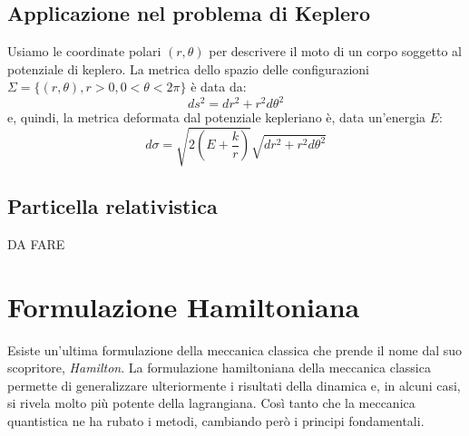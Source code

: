 \documentclass[a4paper,openany]{article}
\begin{document}
	\subsection{Applicazione nel problema di Keplero}
	Usiamo le coordinate polari $(r,\theta)$ per descrivere il moto di un corpo soggetto al potenziale di keplero. La metrica dello spazio delle configurazioni $\Sigma = \{(r,\theta), r>0, 0 <\theta < 2\pi\}$ è data da:
	$$
	ds^2 = dr^2 + r^2d\theta^2
	$$
	e, quindi, la metrica deformata dal potenziale kepleriano è, data un'energia $E$:
	$$
	d\sigma = \sqrt{2(E+\dfrac{k}{r})} \sqrt{dr^2 + r^2d\theta^2}
	$$
	\subsection{Particella relativistica}
	DA FARE
	
	\newpage
	
	\section{Formulazione Hamiltoniana}
	Esiste un'ultima formulazione della meccanica classica che prende il nome dal suo scopritore, \textit{Hamilton}. La formulazione hamiltoniana della meccanica classica permette di generalizzare ulteriormente i risultati della dinamica e, in alcuni casi, si rivela molto più potente della lagrangiana. Così tanto che la meccanica quantistica ne ha rubato i metodi, cambiando però i principi fondamentali.
	
\end{document}
